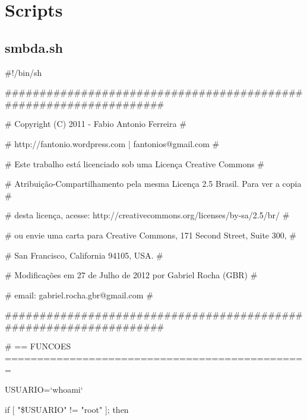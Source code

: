 \appendix 

\chapter{Scripts}

\section{smbda.sh}

\#!/bin/sh
 
\#\#\#\#\#\#\#\#\#\#\#\#\#\#\#\#\#\#\#\#\#\#\#\#\#\#\#\#\#\#\#\#\#\#\#\#\#\#\#\#\#\#\#\#\#\#\#\#\#\#\#\#\#\#\#\#\#\#\#\#\#\#\#\#\#\#

\# Copyright (C) 2011 - Fabio Antonio Ferreira \hspace{160pt} \#

\# http://fantonio.wordpress.com | fantonios@gmail.com \hspace{106pt} \#

\# Este trabalho está licenciado sob uma Licença Creative Commons \hspace{59pt} \#

\# Atribuição-Compartilhamento pela mesma Licença 2.5 Brasil. Para ver a copia \#

\# desta licença, acesse: http://creativecommons.org/licenses/by-sa/2.5/br/ \hspace{34pt} \#

\# ou envie uma carta para Creative Commons, 171 Second Street, Suite 300, \hspace{19pt} \#

\# San Francisco, California 94105, USA. \hspace{188pt} \#

\# Modificações em 27 de Julho de 2012 por Gabriel Rocha (GBR) \hspace{67pt}             \#

\# email: gabriel.rocha.gbr@gmail.com \hspace{198pt} \#

\#\#\#\#\#\#\#\#\#\#\#\#\#\#\#\#\#\#\#\#\#\#\#\#\#\#\#\#\#\#\#\#\#\#\#\#\#\#\#\#\#\#\#\#\#\#\#\#\#\#\#\#\#\#\#\#\#\#\#\#\#\#\#\#\#\#

\# == FUNCOES ===============================================

USUARIO=`whoami`

if [ "\$USUARIO" != "root" ]; then

